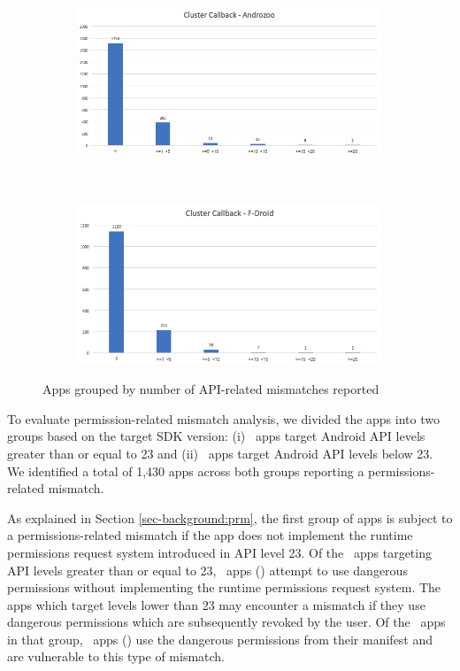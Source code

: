\begin{figure}
        \begin{subfigure}{0.48\textwidth}
        \includegraphics[width=\textwidth]{images/cluster_callback_androzoo.png}
    \end{subfigure}
    ~
    \begin{subfigure}{0.48\textwidth}
        \includegraphics[width=\textwidth]{images/cluster_callback_fdroid.png}
    \end{subfigure}
    \caption{Apps grouped by number of API-related mismatches reported}
    \label{fig:clusters}
\end{figure}

To evaluate permission-related mismatch analysis, we divided the apps into two
groups based on the target SDK version: (i) \prqtotal\ apps target Android API
levels greater than or equal to 23 and (ii) \prvtotal\ apps target Android API
levels below 23. We identified a total of 1,430 apps across both groups
reporting a permissions-related mismatch.

As explained in Section \ref{sec-background:prm}, the first group of apps is
subject to a permissions-related mismatch if the app does not implement the
runtime permissions request system introduced in API level 23. Of the \prqtotal\
apps targeting API levels greater than or equal to 23, \prqcount\ apps
(\prqprcnt) attempt to use dangerous permissions without implementing the
runtime permissions request system. The apps which target levels lower than 23
may encounter a mismatch if they use dangerous permissions which are
subsequently revoked by the user. Of the \prvtotal\ apps in that group,
\prvcount\ apps (\prvprcnt) use the dangerous permissions from their manifest
and are vulnerable to this type of mismatch.

